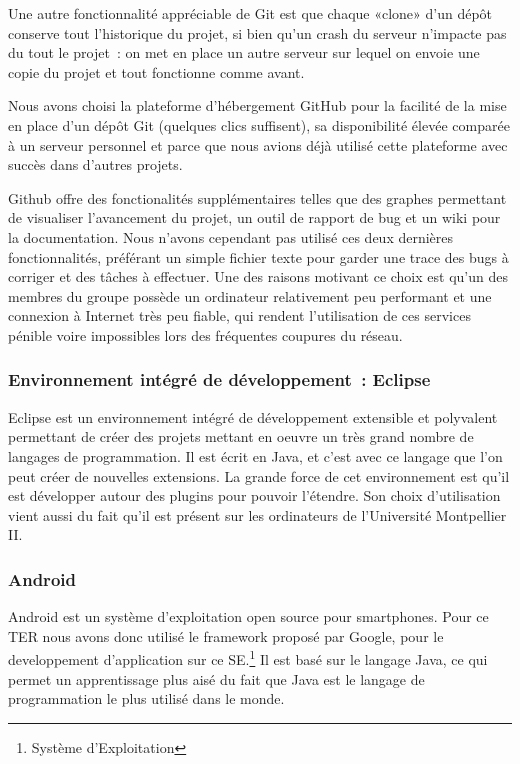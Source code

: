 \documentclass[a4paper,11pt,french]{article}
\def\android{Android\texttrademark{}}
\begin{document}
Une autre fonctionnalité appréciable de Git est que chaque «clone» d'un dépôt conserve tout l'historique du projet, si bien qu'un crash du serveur n'impacte pas du tout le projet~: on met en place un autre serveur sur lequel on envoie une copie du projet et tout fonctionne comme avant.

Nous avons choisi la plateforme d'hébergement GitHub pour la facilité de la mise en place d'un dépôt Git (quelques clics suffisent), sa disponibilité élevée comparée à un serveur personnel et parce que nous avions déjà utilisé cette plateforme avec succès dans d'autres projets.

Github offre des fonctionalités supplémentaires telles que des graphes permettant de visualiser l'avancement du projet, un outil de rapport de bug et un wiki pour la documentation. Nous n'avons cependant pas utilisé ces deux dernières fonctionnalités, préférant un simple fichier texte pour garder une trace des bugs à corriger et des tâches à effectuer. Une des raisons motivant ce choix est qu'un des membres du groupe possède un ordinateur relativement peu performant et une connexion à Internet très peu fiable, qui rendent l'utilisation de ces services pénible voire impossibles lors des fréquentes coupures du réseau.


\subsubsection{Environnement intégré de développement~: Eclipse}
Eclipse est un environnement intégré de développement extensible et polyvalent permettant de créer des projets mettant en oeuvre un très grand nombre de langages de programmation. Il est écrit en Java, et c'est avec ce langage que l'on peut créer de nouvelles extensions. La grande force de cet environnement est qu'il est développer autour des plugins pour pouvoir l'étendre.
Son choix d'utilisation vient aussi du fait qu'il est présent sur les ordinateurs de l'Université Montpellier II.

\subsubsection{\android{}}
\android{} est un système d'exploitation open source pour smartphones. Pour ce TER nous avons donc utilisé le framework proposé par Google, pour le developpement d'application sur ce SE.\footnote{Système d'Exploitation} Il est basé sur le langage Java, ce qui permet un apprentissage plus aisé du fait que Java est le langage de programmation le plus utilisé dans le monde.
\end{document}
